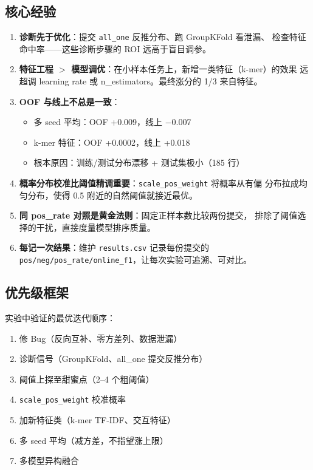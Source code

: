 \documentclass[11pt,a4paper]{article}
\begin{document}
\subsection{核心经验}

\begin{enumerate}
    \item \textbf{诊断先于优化}：提交 \texttt{all\_one} 反推分布、跑 GroupKFold 看泄漏、
          检查特征命中率——这些诊断步骤的 ROI 远高于盲目调参。

    \item \textbf{特征工程 $>$ 模型调优}：在小样本任务上，新增一类特征（k-mer）的效果
          远超调 learning rate 或 n\_estimators。最终涨分的 1/3 来自特征。

    \item \textbf{OOF 与线上不总是一致}：
    \begin{itemize}[nosep]
        \item 多 seed 平均：OOF +0.009，线上 $-$0.007
        \item k-mer 特征：OOF +0.0002，线上 +0.018
        \item 根本原因：训练/测试分布漂移 + 测试集极小（185 行）
    \end{itemize}

    \item \textbf{概率分布校准比阈值精调重要}：\texttt{scale\_pos\_weight} 将概率从有偏
          分布拉成均匀分布，使得 0.5 附近的自然阈值就接近最优。

    \item \textbf{同 pos\_rate 对照是黄金法则}：固定正样本数比较两份提交，
          排除了阈值选择的干扰，直接度量模型排序质量。

    \item \textbf{每记一次结果}：维护 \texttt{results.csv} 记录每份提交的
          \texttt{pos/neg/pos\_rate/online\_f1}，让每次实验可追溯、可对比。
\end{enumerate}

\subsection{优先级框架}

实验中验证的最优迭代顺序：

\begin{enumerate}[nosep]
    \item 修 Bug（反向互补、零方差列、数据泄漏）
    \item 诊断信号（GroupKFold、all\_one 提交反推分布）
    \item 阈值上探至甜蜜点（2--4 个粗阈值）
    \item \texttt{scale\_pos\_weight} 校准概率
    \item 加新特征类（k-mer TF-IDF、交互特征）
    \item 多 seed 平均（减方差，不指望涨上限）
    \item 多模型异构融合
\end{enumerate}
\end{document}
